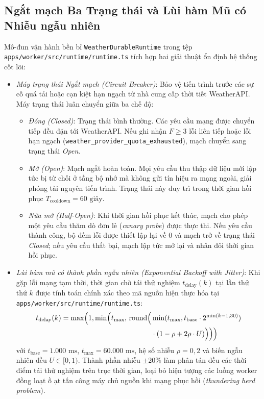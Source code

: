 \subsection{Ngắt mạch Ba Trạng thái và Lùi hàm Mũ có Nhiễu ngẫu nhiên}
Mô-đun vận hành bền bỉ \texttt{WeatherDurableRuntime} trong tệp \texttt{apps/\allowbreak worker/\allowbreak src/\allowbreak runtime/\allowbreak runtime.ts} tích hợp hai giải thuật ổn định hệ thống cốt lõi:
\begin{itemize}
    \item[-] \textit{Máy trạng thái Ngắt mạch (Circuit Breaker)}: Bảo vệ tiến trình trước các sự cố quá tải hoặc cạn kiệt hạn ngạch từ nhà cung cấp thời tiết WeatherAPI. Máy trạng thái luân chuyển giữa ba chế độ:
    \begin{itemize}
        \item[+] \textit{Đóng (Closed)}: Trạng thái bình thường. Các yêu cầu mạng được chuyển tiếp đều đặn tới WeatherAPI. Nếu ghi nhận $F \ge 3$ lỗi liên tiếp hoặc lỗi hạn ngạch (\texttt{weather\_provider\_quota\_exhausted}), mạch chuyển sang trạng thái \textit{Open}.
        \item[+] \textit{Mở (Open)}: Mạch ngắt hoàn toàn. Mọi yêu cầu thu thập dữ liệu mới lập tức bị từ chối ở tầng bộ nhớ mà không gửi tín hiệu ra mạng ngoài, giải phóng tài nguyên tiến trình. Trạng thái này duy trì trong thời gian hồi phục $T_{\text{cooldown}} = 60\text{ giây}$.
        \item[+] \textit{Nửa mở (Half-Open)}: Khi thời gian hồi phục kết thúc, mạch cho phép một yêu cầu thăm dò đơn lẻ (\textit{canary probe}) được thực thi. Nếu yêu cầu thành công, bộ đếm lỗi được thiết lập lại về 0 và mạch trở về trạng thái \textit{Closed}; nếu yêu cầu thất bại, mạch lập tức mở lại và nhân đôi thời gian hồi phục.
    \end{itemize}
    \item[-] \textit{Lùi hàm mũ có thành phần ngẫu nhiên (Exponential Backoff with Jitter)}: Khi gặp lỗi mạng tạm thời, thời gian chờ tái thử nghiệm $t_{\text{delay}}(k)$ tại lần thử thứ $k$ được tính toán chính xác theo mã nguồn hiện thực hóa tại \texttt{apps/\allowbreak worker/\allowbreak src/\allowbreak runtime/\allowbreak runtime.ts}:
    \begin{equation}
    \label{eq:worker_backoff_jitter_impl}
    \begin{aligned}
    t_{\text{delay}}(k) = \max\Bigl(1, \min\Bigl(t_{\max}, \, \text{round}\Bigl(&\min(t_{\max}, t_{\text{base}} \cdot 2^{\min(k-1, 30)}) \\
    &\cdot (1 - \rho + 2\rho \cdot U)\Bigr)\Bigr)\Bigr)
    \end{aligned}
    \end{equation}
    với $t_{\text{base}} = 1.000\text{ ms}$, $t_{\max} = 60.000\text{ ms}$, hệ số nhiễu $\rho = 0{,}2$ và biến ngẫu nhiên đều $U \in [0, 1)$. Thành phần nhiễu $\pm 20\%$ làm phân tán đều các thời điểm tái thử nghiệm trên trục thời gian, loại bỏ hiện tượng các luồng worker đồng loạt ồ ạt tấn công máy chủ nguồn khi mạng phục hồi (\textit{thundering herd problem}).
\end{itemize}

